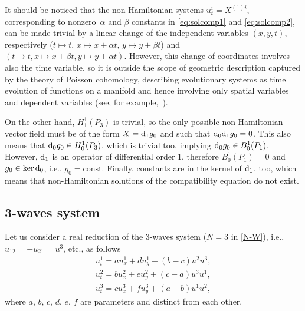 \documentclass[pdftex]{sigma}
\numberwithin{equation}{section}
\begin{document}
It should be noticed that the non-Hamiltonian systems $u^i_t=X^{(1)i}$, corresponding to nonzero~$\alpha$ and $\beta$ constants in \eqref{eq:solcomp1} and \eqref{eq:solcomp2}, can be made trivial by a linear change of the independent variables $(x,y,t)$, respectively ($t\mapsto t$, $x\mapsto x+\alpha t$, $y\mapsto y+\beta t$) and $(t\mapsto t, x\mapsto x+\beta t, y\mapsto y+\alpha t)$. However, this change of coordinates involves also the time variable, so it is outside the scope of geometric description captured by the theory of Poisson cohomology, describing evolutionary systems as time evolution of functions on a manifold and hence involving only spatial variables and dependent variables (see, for example,~\cite{ccs17}).

On the other hand, $H^1_1(P_3)$ is trivial, so the only possible non-Hamiltonian vector field must be of the form $X={\rm d}_1g_0$ and such that ${\rm d}_0{\rm d}_1g_0=0$. This also means that ${\rm d}_0g_0\in H^1_0(P_3)$, which is trivial too, implying ${\rm d}_0g_0\in B^1_0(P_1)$. However, ${\rm d}_1$ is an operator of differential order $1$, therefore $B^1_0(P_1)=0$ and $g_0\in\ker {\rm d}_0$, i.e., $g_0=\mathrm{const}$. Finally, constants are in the kernel of ${\rm d}_1$, too, which means that non-Hamiltonian solutions of the compatibility equation do not exist.

\subsection{3-waves system}
Let us consider a real reduction of the 3-waves system ($N=3$ in \eqref{N-W}), i.e., $u_{12}=-u_{21}=u^3$, etc., as follows
\begin{gather}
u^1_t=au^1_x+du^1_y+(b-c)u^2u^3,\nonumber\\
u^2_t=bu^2_x+eu^2_y+(c-a)u^3u^1,\nonumber\\
u^3_t=cu^3_x+fu^3_y+(a-b)u^1u^2,\label{3-waves}
\end{gather}
where $a$, $b$, $c$, $d$, $e$, $f$ are parameters and distinct from each other.
\end{document}
